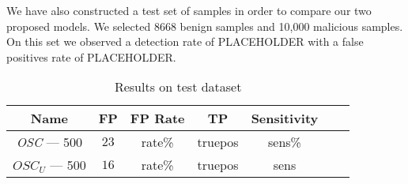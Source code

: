 \par
We have also constructed a test set of samples in order to compare our two proposed models. We selected 8668 benign samples and 10,000 malicious samples. On this set we observed a detection rate of PLACEHOLDER with a false positives rate of PLACEHOLDER.
\begin{table}[ht]
    \centering
    \begin{tabular}{| c | c | c | c | c | c | c | }
    \hline
    Name & FP & FP Rate & TP & Sensitivity\\ \hline
    \textit{OSC} --- 500 & $23$ &  rate\% & truepos & sens\% \\ \hline
    \textit{$OSC_{U}$} --- 500 & $16$ &  rate\% & truepos & sens \\ \hline
    \end{tabular}
    \caption{Results on test dataset} 
    \label{tab:testresults}
\end{table}